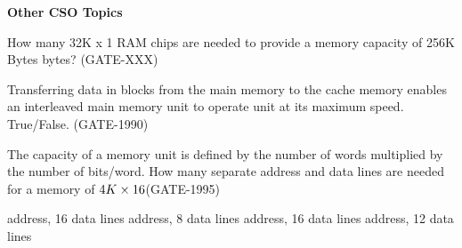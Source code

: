 
\centerline{\textbf{ \LARGE Other CSO Topics}}


\begin{questyle}

  \question  How many 32K x 1 RAM chips are needed to provide a memory capacity of 256K Bytes bytes? (GATE-XXX)

  \begin{oneparchoices}
  \end{oneparchoices}

\end{questyle}


\begin{questyle}

  \question  Transferring data in blocks from the main memory to the cache memory enables an interleaved main memory unit to operate unit at its maximum speed. True/False. (GATE-1990)

\end{questyle}




\begin{questyle}

  \question  The capacity of a memory unit is defined by the number of words multiplied by the number of bits/word. How many separate address and data lines are needed for a memory of \( \large 4K \times 16 \)(GATE-1995)

  \begin{choices}
     address, 16 data lines
     address, 8 data lines
     address, 16 data lines
     address, 12 data lines
  \end{choices}

\end{questyle}
